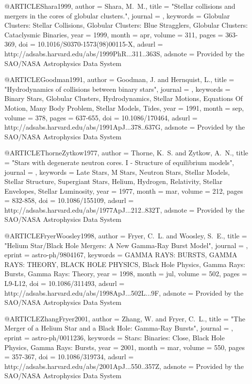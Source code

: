 \documentclass[twocolumn,tighten]{aastex63}
\begin{document}
{{{{@ARTICLE{Shara1999,
   author = {{Shara}, M.~M.},
    title = "{Stellar collisions and mergers in the cores of globular clusters.}",
  journal = {\physrep},
 keywords = {Globular Clusters: Stellar Collisions, Globular Clusters: Blue Stragglers, Globular Clusters: Cataclysmic Binaries},
     year = 1999,
    month = apr,
   volume = 311,
    pages = {363-369},
      doi = {10.1016/S0370-1573(98)00115-X},
   adsurl = {http://adsabs.harvard.edu/abs/1999PhR...311..363S},
  adsnote = {Provided by the SAO/NASA Astrophysics Data System}
}

@ARTICLE{Goodman1991,
   author = {{Goodman}, J. and {Hernquist}, L.},
    title = "{Hydrodynamics of collisions between binary stars}",
  journal = {\apj},
 keywords = {Binary Stars, Globular Clusters, Hydrodynamics, Stellar Motions, Equations Of Motion, Many Body Problem, Stellar Models, Tides},
     year = 1991,
    month = sep,
   volume = 378,
    pages = {637-655},
      doi = {10.1086/170464},
   adsurl = {http://adsabs.harvard.edu/abs/1991ApJ...378..637G},
  adsnote = {Provided by the SAO/NASA Astrophysics Data System}
}

@ARTICLE{ThorneZytkow1977,
   author = {{Thorne}, K.~S. and {Zytkow}, A.~N.},
    title = "{Stars with degenerate neutron cores. I - Structure of equilibrium models}",
  journal = {\apj},
 keywords = {Late Stars, M Stars, Neutron Stars, Stellar Models, Stellar Structure, Supergiant Stars, Helium, Hydrogen, Relativity, Stellar Envelopes, Stellar Luminosity},
     year = 1977,
    month = mar,
   volume = 212,
    pages = {832-858},
      doi = {10.1086/155109},
   adsurl = {http://adsabs.harvard.edu/abs/1977ApJ...212..832T},
  adsnote = {Provided by the SAO/NASA Astrophysics Data System}
}

@ARTICLE{FryerWoosley1998,
   author = {{Fryer}, C.~L. and {Woosley}, S.~E.},
    title = "{Helium Star/Black Hole Mergers: A New Gamma-Ray Burst Model}",
  journal = {\apjl},
   eprint = {astro-ph/9804167},
 keywords = {GAMMA RAYS: BURSTS, GAMMA RAYS: THEORY, BLACK HOLE PHYSICS, Black Hole Physics, Gamma Rays: Bursts, Gamma Rays: Theory},
     year = 1998,
    month = jul,
   volume = 502,
    pages = {L9-L12},
      doi = {10.1086/311493},
   adsurl = {http://adsabs.harvard.edu/abs/1998ApJ...502L...9F},
  adsnote = {Provided by the SAO/NASA Astrophysics Data System}
}

@ARTICLE{ZhangFryer2001,
   author = {{Zhang}, W. and {Fryer}, C.~L.},
    title = "{The Merger of a Helium Star and a Black Hole: Gamma-Ray Bursts}",
  journal = {\apj},
   eprint = {astro-ph/0011236},
 keywords = {Stars: Binaries: Close, Black Hole Physics, Gamma Rays: Bursts},
     year = 2001,
    month = mar,
   volume = 550,
    pages = {357-367},
      doi = {10.1086/319734},
   adsurl = {http://adsabs.harvard.edu/abs/2001ApJ...550..357Z},
  adsnote = {Provided by the SAO/NASA Astrophysics Data System}
}


}}}}
\end{document}
